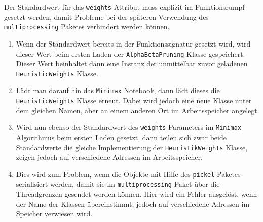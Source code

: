 \documentclass[11pt]{article}
\providecommand{\tightlist}{%
      \setlength{\itemsep}{0pt}\setlength{\parskip}{0pt}}
\begin{document}
Der Standardwert für das \texttt{weights} Attribut muss explizit im
Funktionsrumpf gesetzt werden, damit Probleme bei der späteren
Verwendung des \texttt{multiprocessing} Paketes verhindert werden
können.

\begin{enumerate}
\def\labelenumi{\arabic{enumi}.}
\tightlist
\item
  Wenn der Standardwert bereits in der Funktionssignatur gesetzt wird,
  wird dieser Wert beim ersten Laden der \texttt{AlphaBetaPruning}
  Klasse gespeichert. Dieser Wert beinhaltet dann eine Instanz der
  unmittelbar zuvor geladenen \texttt{HeuristicWeights} Klasse.
\item
  Lädt man darauf hin das \texttt{Minimax} Notebook, dann lädt dieses
  die \texttt{HeuristicWeights} Klasse erneut. Dabei wird jedoch eine
  neue Klasse unter dem gleichen Namen, aber an einem anderen Ort im
  Arbeitsspeicher angelegt.
\item
  Wird nun ebenso der Standardwert des \texttt{weights} Parameters im
  \texttt{Minimax} Algorithmus beim ersten Laden gesetzt, dann teilen
  sich zwar beide Standardwerte die gleiche Implementierung der
  \texttt{HeuristikWeights} Klasse, zeigen jedoch auf verschiedene
  Adressen im Arbeitsspeicher.
\item
  Dies wird zum Problem, wenn die Objekte mit Hilfe des \texttt{pickel}
  Paketes serialisiert werden, damit sie im \texttt{multiprocessing}
  Paket über die Threadgrenzen gesendet werden können. Hier wird ein
  Fehler ausgelöst, wenn der Name der Klassen übereinstimmt, jedoch auf
  verschiedene Adressen im Speicher verwiesen wird.
\end{enumerate}
\end{document}
